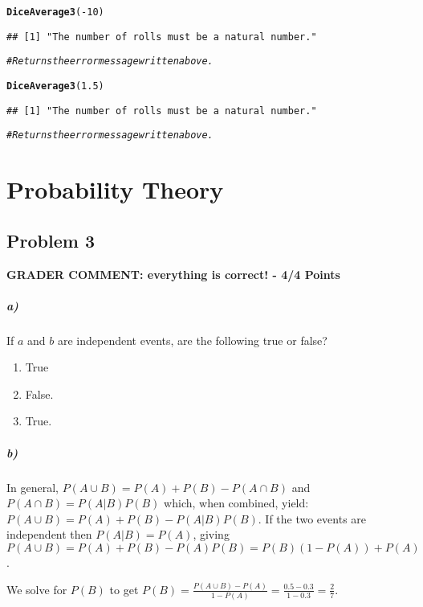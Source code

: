 \documentclass[12pt,letter]{article}\usepackage[]{graphicx}\usepackage[]{color}
\makeatletter
\newcommand{\hlnum}[1]{\textcolor[rgb]{0.686,0.059,0.569}{#1}}%
\newcommand{\hlcom}[1]{\textcolor[rgb]{0.678,0.584,0.686}{\textit{#1}}}%
\newcommand{\hlopt}[1]{\textcolor[rgb]{0,0,0}{#1}}%
\newcommand{\hlstd}[1]{\textcolor[rgb]{0.345,0.345,0.345}{#1}}%
\newcommand{\hlkwd}[1]{\textcolor[rgb]{0.737,0.353,0.396}{\textbf{#1}}}%
\newenvironment{kframe}{%
 \def\at@end@of@kframe{}%
 \ifinner\ifhmode%
  \def\at@end@of@kframe{\end{minipage}}%
  \begin{minipage}{\columnwidth}%
 \fi\fi%
 \def\FrameCommand##1{\hskip\@totalleftmargin \hskip-\fboxsep
 \colorbox{shadecolor}{##1}\hskip-\fboxsep
     \hskip-\linewidth \hskip-\@totalleftmargin \hskip\columnwidth}%
 \MakeFramed {\advance\hsize-\width
   \@totalleftmargin\z@ \linewidth\hsize
   \@setminipage}}%
 {\par\unskip\endMakeFramed%
 \at@end@of@kframe}
\newenvironment{knitrout}{}{} %
\makeatother
\begin{document}
\begin{knitrout}
\begin{kframe}
\begin{alltt}
\hlkwd{DiceAverage3}\hlstd{(}\hlopt{-}\hlnum{10}\hlstd{)}
\end{alltt}
\begin{verbatim}
## [1] "The number of rolls must be a natural number."
\end{verbatim}
\begin{alltt}
\hlcom{# Returns the error message written above.}

\hlkwd{DiceAverage3}\hlstd{(}\hlnum{1.5}\hlstd{)}
\end{alltt}
\begin{verbatim}
## [1] "The number of rolls must be a natural number."
\end{verbatim}
\begin{alltt}
\hlcom{# Returns the error message written above.}
\end{alltt}
\end{kframe}
\end{knitrout}



\section*{Probability Theory}

\subsection*{Problem 3}

\textbf{\color{red} GRADER COMMENT: everything is correct! - 4/4 Points}

\subparagraph{a)} If $a$ and $b$ are independent events, are the following true or false?
\begin{enumerate}
	\item True %
	\item False. %
	\item True. %
\end{enumerate}

\subparagraph{b)} In general, $P(A \cup B)=P(A)+P(B) - P(A \cap B)$ and $P(A \cap B)=P(A|B)P(B)$ which, when combined, yield: $P(A \cup B)=P(A)+P(B) - P(A|B)P(B)$. If the two events are independent then $P(A|B)=P(A)$, giving $P(A \cup B)=P(A)+P(B) - P(A)P(B) = P(B)(1-P(A))+P(A)$.

We solve for $P(B)$ to get $P(B)=\frac{P(A \cup B)-P(A)}{1-P(A)}=\frac{0.5-0.3}{1-0.3}=\frac{2}{7}$.
\end{document}
